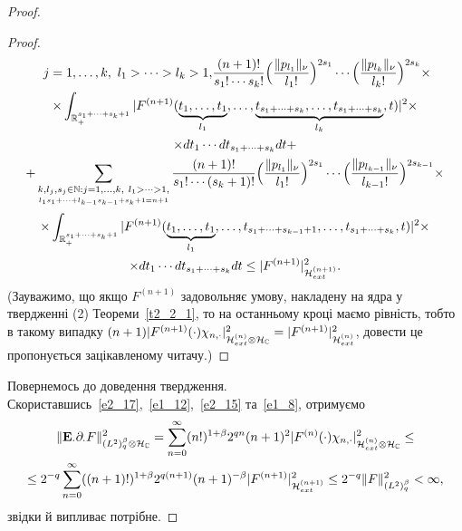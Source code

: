 \begin{proof}
\begin{proof}
\begin{gather*}
{{\ j=1,\dots,k,\ l_1>\cdots>l_k>1,}}
\frac{(n+1)!}{s_1!\cdots s_k!}
\Big(\frac{\|p_{l_1}\|_\nu}{l_1!}\Big)^{2s_1}
\cdots\Big(\frac{\|p_{l_k}\|_\nu}{l_k!}\Big)^{2s_k}\times\\
\times\int_{\mathbb{R}_+^{s_1+\cdots+s_k+1}}|F^{(n+1)}(
\underset{l_1}{\underbrace{t_1,\dots,t_1}},\dots,
\underset{l_k}{\underbrace{t_{s_1+\cdots+s_k},\dots,
t_{s_1+\cdots+s_k}}},t)|^2\times\\
\times dt_1\cdots dt_{s_1+\cdots+s_k}dt+\\
+\sum_{\underset{l_1s_1+\cdots+l_{k-1}s_{k-1}+s_k+1=n+1}{k,l_j,s_j\in\mathbb{N}:
j=1,\dots,k,\ l_1>\cdots>1,}}
\frac{(n+1)!}{s_1!\cdots (s_k+1)!}
\Big(\frac{\|p_{l_1}\|_\nu}{l_1!}\Big)^{2s_1}
\cdots\Big(\frac{\|p_{l_{k-1}}\|_\nu}{l_{k-1}!}\Big)^{2s_{k-1}}\times\\
\times\int_{\mathbb{R}_+^{s_1+\cdots+s_k+1}}|F^{(n+1)}(
\underset{l_1}{\underbrace{t_1,\dots,t_1}},\dots,
t_{s_1+\cdots+s_{k-1}+1},\dots,t_{s_1+\cdots+s_k},t)|^2\times\\
\times dt_1\cdots dt_{s_1+\cdots+s_k}dt
\leq |F^{(n+1)}|_{\mathcal{H}_{ext}^{(n+1)}}^2.
\end{gather*}
(Зауважимо, що якщо  $F^{(n+1)}$ задовольняє умову, накладену на ядра у твердженні (2)
Теореми~\ref{t2_2_1}, то на останньому кроці маємо рівність, тобто в такому випадку
$(n+1)|F^{(n+1)}(\cdot)\chi_{n,\cdot}|_{\mathcal{H}_{ext}^{(n)}\otimes\mathcal{H}_{\mathbb{C}}}^2
=|F^{(n+1)}|_{\mathcal{H}_{ext}^{(n)}}^2$, довести це пропонується зацікавленому читачу.)
\end{proof}
Повернемось до доведення твердження. Скориставшись~\eqref{e2_17},~\eqref{e1_12},~\eqref{e2_15}
та~\eqref{e1_8}, отримуємо
\begin{gather*}
\|\mathbf{E}_\cdot\partial_\cdot F\|_{(L^2)^\beta_q\otimes\mathcal{H}_{\mathbb{C}}}^2
=\sum_{n=0}^\infty (n!)^{1+\beta}2^{qn}(n+1)^2
|F^{(n)}(\cdot)\chi_{n,\cdot}|_{\mathcal{H}_{ext}^{(n)}\otimes\mathcal{H}_{\mathbb{C}}}^2\leq\\
\leq 2^{-q}\sum_{n=0}^\infty ((n+1)!)^{1+\beta}2^{q(n+1)}(n+1)^{-\beta}
|F^{(n+1)}|_{\mathcal{H}_{ext}^{(n+1)}}^2
\leq 2^{-q}\|F\|_{(L^2)^\beta_q}^2<\infty,
\end{gather*}
звідки й випливає потрібне.
\end{proof}

